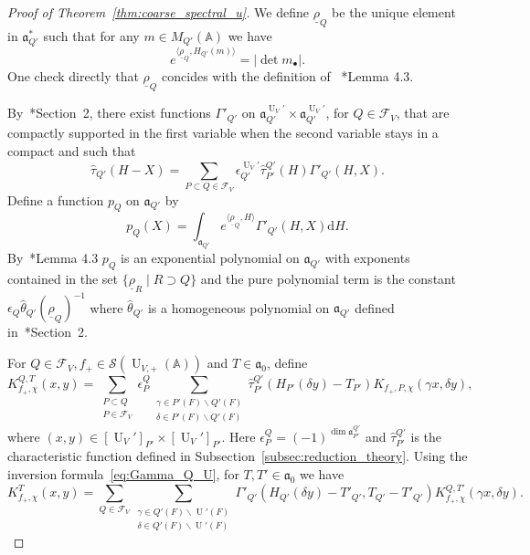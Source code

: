 \documentclass[letterpaper,11pt]{amsart}
\newcommand{\fa}{\mathfrak{a}}
\newcommand{\bA}{\mathbb{A}}
\newcommand{\cF}{\mathcal{F}}
\newcommand{\cS}{\mathcal{S}}
\newcommand{\rd}{\mathrm{d}}
\newcommand{\<}{\negthickspace}
\providecommand{\abs}[1]{\lvert#1\rvert}
\DeclareMathOperator{\U}{U}
\theoremstyle{definition}
\theoremstyle{plain}
\theoremstyle{remark}
\numberwithin{equation}{section}
\begin{document}
\begin{proof}[Proof of Theorem~\ref{thm:coarse_spectral_u}]

We define $\underline{\rho}_Q$ be the unique element in $\fa_{Q'}^*$ such that for any $m \in M_{Q'}(\bA)$ we have
    \[
    e^{\langle \underline{\rho}_Q, H_{Q'}(m) \rangle} =
    \abs{\det m_\bullet}.
    \]
One check directly that $\underline{\rho}_Q$ concides with the definition of ~\cite{Zydor3}*{Lemma 4.3}.

By~\cite{Arthur1}*{Section~2}, there exist functions $\Gamma'_{Q'}$ on
$\fa_{Q'}^{\U_V'} \times \fa_{Q'}^{\U_V'}$, for $Q \in \cF_V$, that are
compactly supported in the first variable when the second variable stays in a
compact and such that
    \begin{equation}    \label{eq:Gamma_Q_U}
    \widehat{\tau}_{Q'}(H-X) = \sum_{P \subset Q \in \cF_V}
    \epsilon_{Q'}^{\U_V'} \widehat{\tau}_{P'}^{Q'}(H)
    \Gamma'_{Q'}(H, X).
    \end{equation}
Define a function $p_Q$ on $\fa_{Q'}$ by
    \begin{equation}    \label{eq:polynomial_exponential_Q'}
    p_Q(X) = \int_{\fa_{Q'}}
    e^{\langle \underline{\rho}_{Q}, H \rangle} \Gamma'_{Q'}(H,X) \rd H.
    \end{equation}
By~\cite{Zydor3}*{Lemma 4.3} $p_Q$ is an exponential polynomial on
$\fa_{Q'}$ with exponents contained in the set $\{\underline{\rho}_R
\mid R \supset Q \}$ and the pure polynomial term is the constant $\epsilon_Q
\widehat{\theta}_{Q'}(\underline{\rho}_Q)^{-1}$ where $\widehat{\theta}_{Q'}$ is a homogeneous polynomial on $\fa_{Q'}$ defined
in~\cite{Arthur1}*{Section~2}.

For $Q \in \cF_V, f_+ \in \cS(\U_{V,+}(\bA))$ and $ T \in \fa_0$, define
    \[
    K_{f_+,\chi}^{Q,T}(x,y) =
    \sum_{\substack{P \subset Q \\ P \in \cF_V}}
    \epsilon_P^Q \sum_{\substack{\gamma \in P'(F) \backslash Q'(F) \\
    \delta \in P'(F) \backslash Q'(F)}}
    \widehat{\tau}_{P'}^{Q'}(H_{P'}(\delta y)-T_{P'})
    K_{f_+,P,\chi}(\gamma x,\delta y),
    \]
where $(x,y) \in [\U_V']_{P'} \times [\U_V']_{P'}$. Here $\epsilon_P^Q =
(-1)^{\dim \fa_{P'}^{Q'}}$ and $\widehat{\tau}_{P'}^{Q'}$ is the characteristic
function defined in Subsection~\ref{subsec:reduction_theory}.
Using the inversion formula~\eqref{eq:Gamma_Q_U}, for $T,T'
\in \fa_0$ we have
    \[
    K_{f_+,\chi}^T(x,y) = \sum_{Q \in \cF_V}
    \sum_{ \substack{\gamma \in Q'(F) \backslash \U'(F) \\
    \delta \in Q'(F) \backslash \U'(F)}}
    \Gamma'_{Q'}(H_{Q'}(\delta y)-T'_{Q'}, T_{Q'}-T'_{Q'})
    K_{f_+,\chi}^{Q,T'}(\gamma x,\delta y).
    \]




\end{proof}
\end{document}
